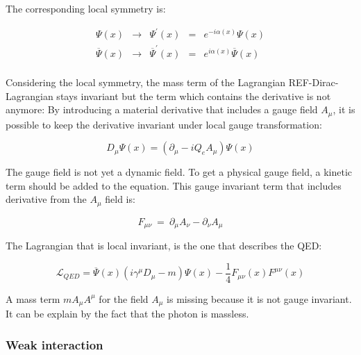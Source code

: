       The corresponding local symmetry is:

      \begin{equation}
            \begin{array}{rcccr}
             \Psi\left(x\right) & \rightarrow & \Psi^{'} \left(x \right) & = & e^{-i\alpha(x)} \Psi\left(x\right) \\
             \overline{\Psi}\left(x\right) & \rightarrow & \overline{\Psi}^{'}\left(x\right) & = & e^{i\alpha(x)}  \overline{\Psi}\left(x\right) \\
            \end{array}
      \end{equation}

      Considering the local symmetry, the mass term of the Lagrangian REF-Dirac-Lagrangian stays invariant but the term which contains the derivative is not anymore:
      By introducing a material derivative that includes a gauge field $A_{\mu}$, it is possible to keep the derivative invariant under local gauge transformation:

      \begin{equation}
        D_{\mu} \Psi\left(x\right) =  \left(\partial_{\mu} - i Q_e A_{\mu}\right) \Psi\left(x\right)
      \end{equation}

     The gauge field is not yet a dynamic field. To get a physical gauge field, a kinetic term should be added to the equation.
     This gauge invariant term that includes derivative from the $A_{\mu}$ field is:
    
     \begin{equation}
       F_{\mu \nu} \ = \ \partial_\mu A_\nu - \partial_\nu A_\mu
     \end{equation}

     The Lagrangian that is local invariant, is the one that describes the QED:

    \begin{equation}
    	\mathcal{L}_{QED} =  \overline{\Psi}\left(x\right)\left( i \gamma^\mu D_\mu - m \right) \Psi\left(x\right) - \frac{1}{4}F_{\mu \nu}\left(x\right) F^{\mu \nu}\left(x\right)
    \end{equation}

    A mass term $m A_{\mu} A^{\mu}$ for the field $A_{\mu}$ is missing because it is not gauge invariant. It can be explain by the fact that the photon is massless.

    \subsubsection{Weak interaction}


